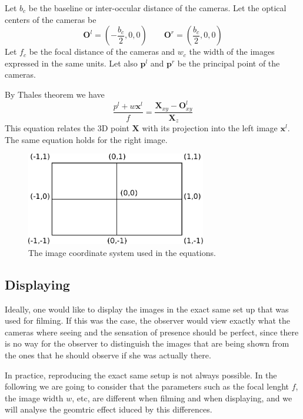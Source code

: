 \documentclass[12pt,a4paper]{article}
\def\x{\mathbf x}
\def\X{\mathbf X}
\def\O{\mathbf O}
\def\p{\mathbf p}
\begin{document}
Let $b_c$ be the baseline or inter-occular distance of the cameras.  Let the optical centers of the cameras be
\begin{equation}
 \O^l = (-\frac{b_c}{2}, 0, 0)  \quad\quad  \O^r = (\frac{b_c}{2}, 0, 0)
\end{equation}
Let $f_c$ be the focal distance of the cameras and $w_c$ the width of the images expressed in the same units.  Let also $\p^l$ and $\p^r$ be the principal point of the cameras.


By Thales theorem we have
\begin{equation}
 \frac{p^l + w \x^l}{f} = \frac{\X_{xy} - \O^l_{xy}}{\X_z}
\end{equation}
This equation relates the 3D point $\X$ with its projection into the left image $\x^l$.  The same equation holds for the right image.


\begin{figure}
 \begin{center}
  \includegraphics[width=0.7\textwidth]{image_coordinate.pdf}
 \end{center}
 \caption{The image coordinate system used in the equations.}
\end{figure}

\subsection{Displaying}
Ideally, one would like to display the images in the exact same set up that was used for filming.  If this was the case, the observer would view exactly what the cameras where seeing and the sensation of presence should be perfect, since there is no way for the observer to distinguish the images that are being shown from the ones that he should observe if she was actually there.

In practice, reproducing the exact same setup is not always possible.  In the following we are going to consider that the parameters such as the focal lenght $f$, the image width $w$, etc, are different when filming and when displaying, and we will analyse the geomtric effect iduced by this differences.
\end{document}
